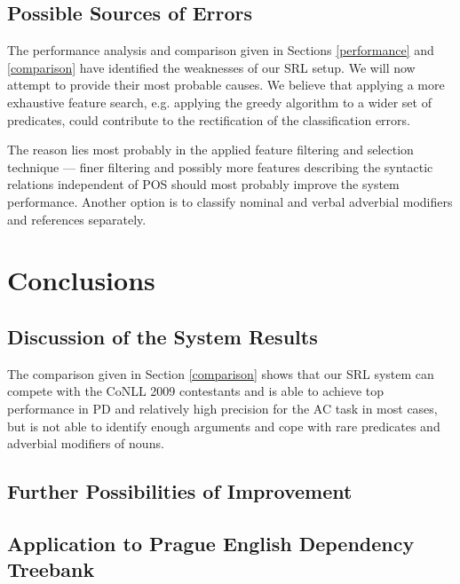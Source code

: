 \documentclass[12pt,notitlepage]{report}
\begin{document}
\section{Possible Sources of Errors}\label{error-sources}

The performance analysis and comparison given in Sections \ref{performance} and \ref{comparison} have identified the weaknesses of our SRL setup. We will now attempt to provide their most probable causes. 
We believe that applying a more exhaustive feature search, e.g. applying the greedy algorithm to a wider set of predicates, could contribute to the rectification of the classification errors. %

 The reason lies most probably in the applied feature filtering and selection technique --- finer filtering and possibly more features describing the syntactic relations independent of POS should most probably improve the system performance. Another option is to classify nominal and verbal adverbial modifiers and references separately. 



%
%
\chapter{Conclusions}\label{conclusions}
%
%

\section{Discussion of the System Results}

The comparison given in Section \ref{comparison} shows that our SRL system can compete with the CoNLL 2009 contestants and is able to achieve top performance in PD and relatively high precision for the AC task in most cases, but is not able to identify enough arguments and cope with rare predicates and adverbial modifiers of nouns.

\section{Further Possibilities of Improvement}

\section{Application to Prague English Dependency Treebank}

\cleardoublepage
{}
\printnomenclature[2cm]
\cleardoublepage


\end{document}
